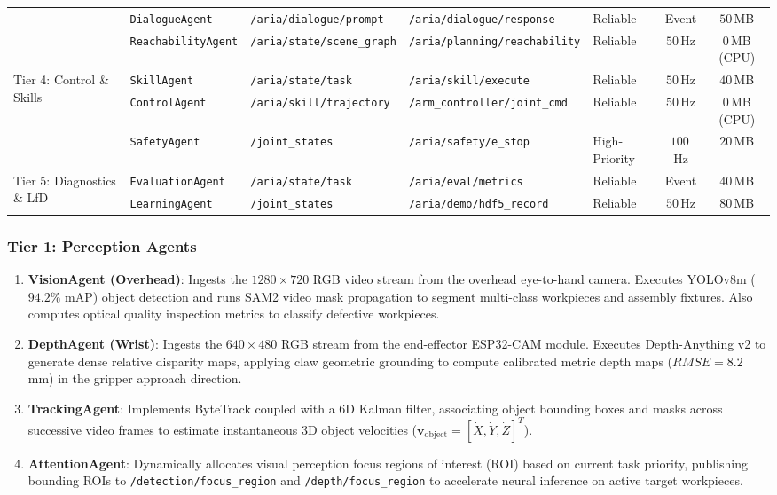 \documentclass[journal]{IEEEtran}
\begin{document}
\begin{table}[!t]
{\begin{tabular}{lllllcc}
 & \texttt{DialogueAgent} & \texttt{/aria/dialogue/prompt} & \texttt{/aria/dialogue/response} & Reliable & Event & $50$\,MB \\
 & \texttt{ReachabilityAgent} & \texttt{/aria/state/scene\_graph} & \texttt{/aria/planning/reachability} & Reliable & $50$\,Hz & $0$\,MB (CPU) \\
\midrule
\multirow{3}{*}{Tier 4: Control \& Skills} & \texttt{SkillAgent} & \texttt{/aria/state/task} & \texttt{/aria/skill/execute} & Reliable & $50$\,Hz & $40$\,MB \\
 & \texttt{ControlAgent} & \texttt{/aria/skill/trajectory} & \texttt{/arm\_controller/joint\_cmd} & Reliable & $50$\,Hz & $0$\,MB (CPU) \\
 & \texttt{SafetyAgent} & \texttt{/joint\_states} & \texttt{/aria/safety/e\_stop} & High-Priority & $100$\,Hz & $20$\,MB \\
\midrule
\multirow{2}{*}{Tier 5: Diagnostics \& LfD} & \texttt{EvaluationAgent} & \texttt{/aria/state/task} & \texttt{/aria/eval/metrics} & Reliable & Event & $40$\,MB \\
 & \texttt{LearningAgent} & \texttt{/joint\_states} & \texttt{/aria/demo/hdf5\_record} & Reliable & $50$\,Hz & $80$\,MB \\
\bottomrule
\end{tabular}%
}
\end{table}

\subsubsection{Tier 1: Perception Agents}
\begin{enumerate}
    \item \textbf{VisionAgent (Overhead)}: Ingests the $1280\times720$ RGB video stream from the overhead eye-to-hand camera. Executes YOLOv8m ($94.2\%$ mAP) object detection and runs SAM2 video mask propagation to segment multi-class workpieces and assembly fixtures. Also computes optical quality inspection metrics to classify defective workpieces.
    \item \textbf{DepthAgent (Wrist)}: Ingests the $640\times480$ RGB stream from the end-effector ESP32-CAM module. Executes Depth-Anything v2 to generate dense relative disparity maps, applying claw geometric grounding to compute calibrated metric depth maps ($RMSE = 8.2$\,mm) in the gripper approach direction.
    \item \textbf{TrackingAgent}: Implements ByteTrack coupled with a 6D Kalman filter, associating object bounding boxes and masks across successive video frames to estimate instantaneous 3D object velocities ($\mathbf{v}_{\text{object}} = [\dot{X}, \dot{Y}, \dot{Z}]^T$).
    \item \textbf{AttentionAgent}: Dynamically allocates visual perception focus regions of interest (ROI) based on current task priority, publishing bounding ROIs to \texttt{/detection/focus\_region} and \texttt{/depth/focus\_region} to accelerate neural inference on active target workpieces.
\end{enumerate}
\end{document}
